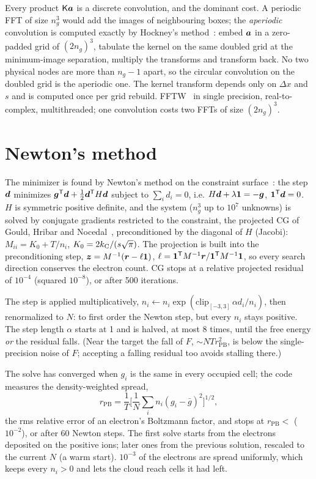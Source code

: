 Every product $\mathsf K\bm{a}$ is a discrete convolution, and the dominant cost.
A periodic FFT of size $n_g^3$ would add the images of neighbouring boxes; the \emph{aperiodic} convolution is computed
exactly by Hockney's method~\cite{hockney1970,eastwood1979}: embed $\bm{a}$ in a zero-padded grid of $(2n_g)^3$,
tabulate the kernel on the same doubled grid at the minimum-image separation, multiply the transforms and transform
back.
No two physical nodes are more than $n_g-1$ apart, so the circular convolution on the doubled grid is the aperiodic one.
The kernel transform depends only on $\Delta x$ and $s$ and is computed once per grid rebuild.
FFTW~\cite{frigo2005} in single precision, real-to-complex, multithreaded; one convolution costs two FFTs of size
$(2n_g)^3$.

\section{Newton's method}

The minimizer is found by Newton's method on the constraint surface~\cite{nocedal2006}: the step $\bm{d}$ minimizes
$\bm{g}^{\mathsf T}\bm{d} + \frac12\bm{d}^{\mathsf T}H\bm{d}$ subject to $\sum_id_i = 0$, i.e.
$H\bm{d} + \lambda\bm{1} = -\bm{g}$, $\bm{1}^{\mathsf T}\bm{d} = 0$.
$H$ is symmetric positive definite, and the system ($n_g^3$ up to $10^7$ unknowns) is solved by conjugate gradients
restricted to the constraint, the projected CG of Gould, Hribar and Nocedal~\cite{gould2001}, preconditioned by the
diagonal of $H$ (Jacobi): $M_{ii} = K_0 + T/n_i$, $K_0 = 2k_{\mathrm C}/(s\sqrt\pi)$.
The projection is built into the preconditioning step,
$\bm{z} = M^{-1}(\bm{r} - \ell\bm{1})$, $\ell = \bm{1}^{\mathsf T}M^{-1}\bm{r}/\bm{1}^{\mathsf T}M^{-1}\bm{1}$,
so every search direction conserves the electron count.
CG stops at a relative projected residual of $10^{-4}$ (squared $10^{-8}$), or after 500 iterations.

The step is applied multiplicatively, $n_i\leftarrow n_i\exp(\mathrm{clip}_{[-3,3]}\,\alpha d_i/n_i)$, then renormalized
to $N$: to first order the Newton step, but every $n_i$ stays positive.
The step length $\alpha$ starts at 1 and is halved, at most 8 times, until the free energy \emph{or} the residual
falls.
(Near the target the fall of $F$, $\sim NT r_{\mathrm{PB}}^2$, is below the single-precision noise of $F$; accepting a
falling residual too avoids stalling there.)

The solve has converged when $g_i$ is the same in every occupied cell; the code measures the density-weighted spread,
\begin{equation}
  r_{\mathrm{PB}} = \frac1T\Big[\frac1N\sum_in_i(g_i-\bar g)^2\Big]^{1/2},
\end{equation}
the rms relative error of an electron's Boltzmann factor, and stops at $r_{\mathrm{PB}} <$ 
($10^{-2}$), or after 60 Newton steps.
The first solve starts from the electrons deposited on the positive ions; later ones from the previous solution,
rescaled to the current $N$ (a warm start).
$10^{-3}$ of the electrons are spread uniformly, which keeps every $n_i>0$ and lets the cloud reach cells it had left.

